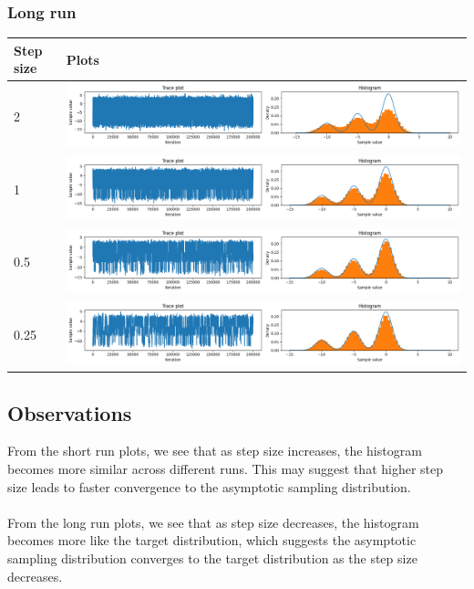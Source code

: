 \documentclass{article}
\theoremstyle{definition}
\newcommand{\1}{\mathbbm{1}}
\begin{document}
{\renewcommand{\arraystretch}{4}%
	\subsubsection{Long run}
	\begin{tabular}{|l|l|}
		\hline
		Step size & Plots\\
		\hline
		2 & \includegraphics[width=0.8\linewidth, height=0.1\linewidth, valign=m]{Different variance/2long.png} \\
		\hline
1 & \includegraphics[width=0.8\linewidth, height=0.1\linewidth, valign=m]{Different variance/1long.png} \\
		\hline
0.5 & \includegraphics[width=0.8\linewidth, height=0.1\linewidth, valign=m]{Different variance/0_5long.png} \\
		\hline
0.25 & \includegraphics[width=0.8\linewidth, height=0.1\linewidth, valign=m]{Different variance/0_25long.png} \\
\hline
	\end{tabular}
}
\subsection{Observations}
From the short run plots, we see that as step size increases, the histogram becomes more similar across different runs. This may suggest that higher step size leads to faster convergence to the asymptotic sampling distribution.
\\\\
From the long run plots, we see that as step size decreases, the histogram becomes more like the target distribution, which suggests the asymptotic sampling distribution converges to the target distribution as the step size decreases.
\end{document}
